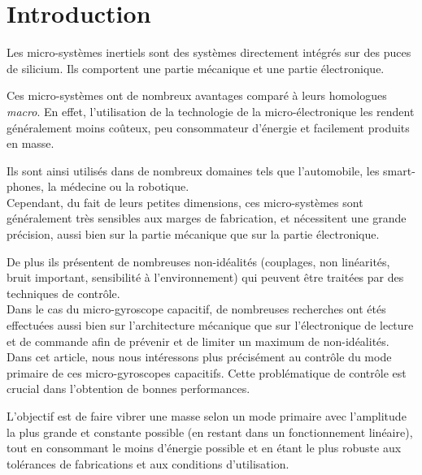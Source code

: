 \chapter*{Introduction}
\label{sec:introduction}

Les micro-systèmes inertiels sont des systèmes directement intégrés sur des puces de silicium. Ils comportent une partie mécanique et une partie électronique.

Ces micro-systèmes ont de nombreux avantages comparé à leurs homologues \textit{macro}. En effet, l'utilisation de la technologie de la micro-électronique les rendent généralement moins coûteux, peu consommateur d'énergie et facilement produits en masse.

Ils sont ainsi utilisés dans de nombreux domaines tels que l'automobile, les smart-phones, la médecine ou la robotique.\\

Cependant, du fait de leurs petites dimensions, ces micro-systèmes sont généralement très sensibles aux marges de fabrication, et nécessitent une grande précision, aussi bien sur la partie mécanique que sur la partie électronique.

De plus ils présentent de nombreuses non-idéalités (couplages, non linéarités, bruit important, sensibilité à l'environnement) qui peuvent être traitées par des techniques de contrôle.\\

Dans le cas du micro-gyroscope capacitif, de nombreuses recherches ont étés effectuées aussi bien sur l'architecture mécanique que sur l'électronique de lecture et de commande afin de prévenir et de limiter un maximum de non-idéalités.\\

Dans cet article, nous nous intéressons plus précisément au contrôle du mode primaire de ces micro-gyroscopes capacitifs. Cette problématique de contrôle est crucial dans l'obtention de bonnes performances.

L'objectif est de faire vibrer une masse selon un mode primaire avec l'amplitude la plus grande et constante possible (en restant dans un fonctionnement linéaire), tout en consommant le moins d'énergie possible et en étant le plus robuste aux tolérances de fabrications et aux conditions d'utilisation.\\

